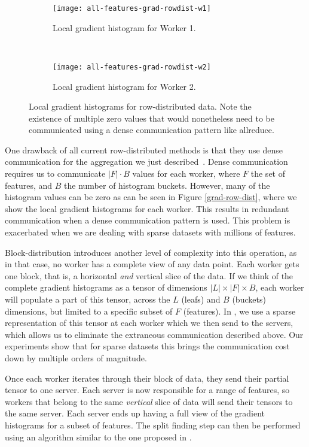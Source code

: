 \begin{figure}
	\centering
	\begin{subfigure}[t]{\textwidth}
		\centering
		\texttt{[image: all-features-grad-rowdist-w1]}
		\caption{Local gradient histogram for Worker 1.}
		\label{fig:grad-row-dist-w1}
	\end{subfigure}
	\\
	\begin{subfigure}[t]{\textwidth}
		\centering
		\texttt{[image: all-features-grad-rowdist-w2]}
		\caption{Local gradient histogram for Worker 2.}
		\label{fig:grad-row-dist-w2}
	\end{subfigure}
	\caption{Local gradient histograms for row-distributed data. Note the existence of multiple
	zero values that would nonetheless need to be communicated using a dense communication pattern like
	allreduce.}
	\label{fig:grad-row-dist}
\end{figure}


One drawback of all current row-distributed methods is that they use dense communication
for the aggregation we just described~\cite{xgboost, lightgbm, catboost, dimboost}. Dense communication
requires us to communicate $|F| \cdot B$ values for each worker, where $F$ the set of features,
and $B$ the number of histogram buckets. However,
many of the histogram values can be zero as can be seen in Figure \ref{grad-row-dist}, where we show
the local gradient histograms for each worker. This results in redundant communication when
a dense communication pattern is used. This problem is exacerbated when we are dealing with sparse
datasets with millions of features.

Block-distribution introduces another level of complexity into this operation, as
in that case, no worker has a complete view of any data point. Each worker gets one block,
that is, a horizontal \emph{and} vertical slice of the data. If we think of the complete
gradient histograms as a tensor of dimensions $|L| \times |F| \times B$, each worker
will populate a part of this tensor, across the $L$ (leafs) and $B$ (buckets) dimensions, but limited to a specific
subset of $F$ (features). In \blockgbt, we use a sparse representation of this tensor at each worker
which we then send to the servers, which allows
us to eliminate the extraneous communication described above. Our experiments show
that for sparse datasets this brings the communication cost down by multiple orders
of magnitude.

Once each worker iterates
through their block of data, they send their partial tensor to one server. Each server
is now responsible for a range of features, so workers that belong to the same \emph{vertical}
slice of data will send their tensors to the same server. Each server ends up having
a full view of the gradient histograms for a subset of features. The split finding step
can then be performed using an algorithm similar to the one proposed in \citet{dimboost}.

